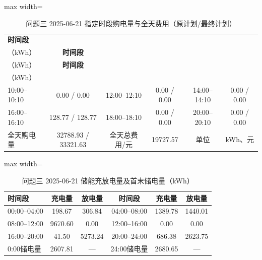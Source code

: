 \documentclass[UTF8,a4paper,zihao=-4,fontset=windows]{ctexart}
\begin{document}
\begin{table}[H]\centering
\fontsize{9.5}{12}\selectfont\setlength{\tabcolsep}{4pt}\renewcommand{\arraystretch}{1.12}
\begin{adjustbox}{max width=\linewidth}\begin{tabular}{lccccc}\toprule
\textbf{时间段} & \shortstack{\textbf{购电量}\\{\normalfont （kWh）}} & \textbf{时间段} & \shortstack{\textbf{购电量}\\{\normalfont （kWh）}} & \textbf{时间段} & \shortstack{\textbf{购电量}\\{\normalfont （kWh）}}\\\midrule
10:00–10:10 & 0.00 / 0.00 & 12:00–12:10 & 0.00 / 0.00 & 14:00–14:10 & 0.00 / 0.00\\
16:00–16:10 & 128.77 / 128.77 & 18:00–18:10 & 0.00 / 0.00 & 20:00–20:10 & 0.00 / 0.00\\
全天购电量 & 32788.93 / 33321.63 & 全天总费用/元 & 19727.57 & 单位 & kWh、元\\
\bottomrule\end{tabular}\end{adjustbox}
\caption{问题三 2025-06-21 指定时段购电量与全天费用（原计划/最终计划）}
\end{table}
\begin{table}[H]\centering
\fontsize{9.5}{12}\selectfont\setlength{\tabcolsep}{4pt}\renewcommand{\arraystretch}{1.12}
\begin{adjustbox}{max width=\linewidth}\begin{tabular}{lccccc}\toprule
\textbf{时间段} & \textbf{充电量} & \textbf{放电量} & \textbf{时间段} & \textbf{充电量} & \textbf{放电量}\\\midrule
00:00–04:00 & 198.67 & 306.84 & 04:00–08:00 & 1389.78 & 1440.01\\
08:00–12:00 & 9670.60 & 0.00 & 12:00–16:00 & 0.00 & 0.00\\
16:00–20:00 & 41.50 & 5273.24 & 20:00–24:00 & 686.38 & 2623.75\\
0:00储电量 & 2607.81 & — & 24:00储电量 & 2680.65 & —\\
\bottomrule\end{tabular}\end{adjustbox}
\caption{问题三 2025-06-21 储能充放电量及首末储电量（kWh）}
\end{table}
\end{document}
